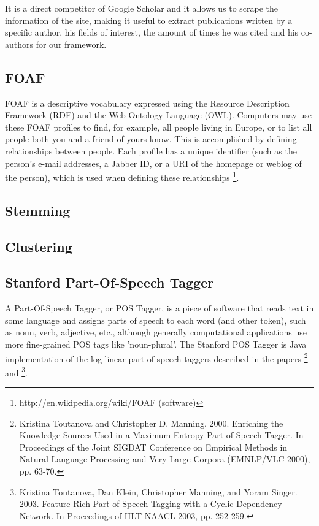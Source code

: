 It is a direct competitor of Google Scholar and it allows us to scrape the information of the site, making it useful to extract publications written by a specific author, his fields of interest, the amount of times he was cited and his co-authors for our framework.

\subsection{FOAF}

FOAF is a descriptive vocabulary expressed using the Resource Description Framework (RDF) and the Web Ontology Language (OWL). Computers may use these FOAF profiles to find, for example, all people living in Europe, or to list all people both you and a friend of yours know. This is accomplished by defining relationships between people. Each profile has a unique identifier (such as the person's e-mail addresses, a Jabber ID, or a URI of the homepage or weblog of the person), which is used when defining these relationships \footnote{http://en.wikipedia.org/wiki/FOAF (software)}.


\subsection{Stemming}

\subsection{Clustering}

\subsection{Stanford Part-Of-Speech Tagger}


A Part-Of-Speech Tagger, or POS Tagger, is a piece of software that reads text in some language and assigns parts of speech to each word (and other token), such as noun, verb, adjective, etc., although generally computational applications use more fine-grained POS tags like 'noun-plural'. The Stanford POS Tagger is Java implementation of the log-linear part-of-speech taggers described in the papers \footnote{Kristina Toutanova and Christopher D. Manning. 2000. Enriching the Knowledge Sources Used in a Maximum Entropy Part-of-Speech Tagger. In Proceedings of the Joint SIGDAT Conference on Empirical Methods in Natural Language Processing and Very Large Corpora (EMNLP/VLC-2000), pp. 63-70.} and \footnote{Kristina Toutanova, Dan Klein, Christopher Manning, and Yoram Singer. 2003. Feature-Rich Part-of-Speech Tagging with a Cyclic Dependency Network. In Proceedings of HLT-NAACL 2003, pp. 252-259.}.

